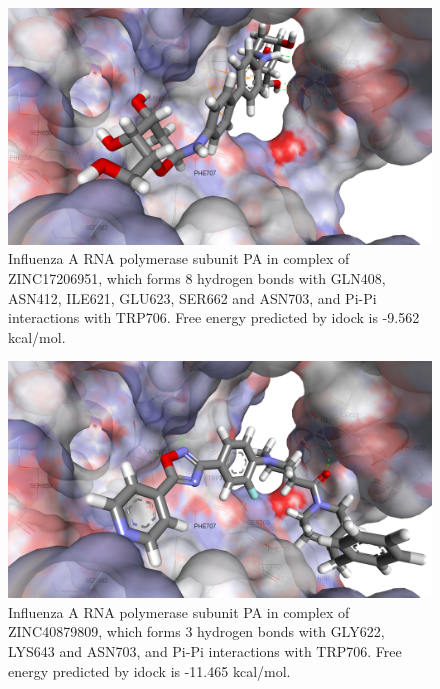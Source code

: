 \begin{figure}
\centering
\includegraphics[width=\linewidth]{../influenza/2ZNL-ZINC17206951.png}
\caption{Influenza A RNA polymerase subunit PA in complex of ZINC17206951, which forms 8 hydrogen bonds with GLN408, ASN412, ILE621, GLU623, SER662 and ASN703, and Pi-Pi interactions with TRP706. Free energy predicted by idock is -9.562 kcal/mol.}
\label{influenza:2ZNL-ZINC17206951}
\end{figure}

\begin{figure}
\centering
\includegraphics[width=\linewidth]{../influenza/2ZNL-ZINC40879809.png}
\caption{Influenza A RNA polymerase subunit PA in complex of ZINC40879809, which forms 3 hydrogen bonds with GLY622, LYS643 and ASN703, and Pi-Pi interactions with TRP706. Free energy predicted by idock is -11.465 kcal/mol.}
\label{influenza:2ZNL-ZINC40879809}
\end{figure}

